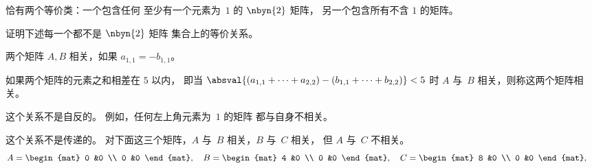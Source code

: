\begin{exercises}
\begin{answer}
\begin{exparts}
        恰有两个等价类：一个包含任何
        至少有一个元素为~$1$ 的 $\nbyn{2}$ 矩阵，
        另一个包含所有不含 $1$ 的矩阵。
    \end{exparts}
  \end{answer}
  \item 证明下述每一个都不是 $\nbyn{2}$ 矩阵
    集合上的等价关系。
    \begin{exparts}
      \item 两个矩阵 $A,B$ 相关，如果 $a_{1,1}=-b_{1,1}$。
      \item 如果两个矩阵的元素之和相差在 $5$ 以内，
        即当
        $\absval{(a_{1,1}+\cdots+a_{2,2})-(b_{1,1}+\cdots+b_{2,2})}<5$ 时 $A$ 与~$B$ 相关，则称这两个矩阵相关。
    \end{exparts}
    \begin{answer}
      \begin{exparts}
        \item 这个关系不是自反的。
          例如，任何左上角元素为~$1$ 的矩阵
          都与自身不相关。
        \item 这个关系不是传递的。
          对下面这三个矩阵，$A$ 与~$B$ 相关，$B$ 与~$C$ 相关，
          但 $A$ 与~$C$ 不相关。
          \begin{equation*}
            A=\begin{mat}
              0 &0 \\
              0 &0
            \end{mat},\quad
            B=\begin{mat}
              4 &0 \\
              0 &0
            \end{mat},\quad
            C=\begin{mat}
              8 &0 \\
              0 &0
            \end{mat},\quad
          \end{equation*}
      \end{exparts}
    \end{answer}
\end{exercises}




















